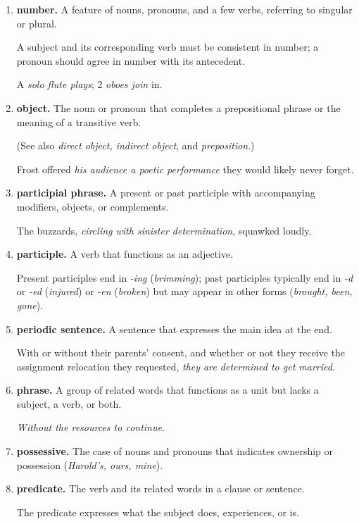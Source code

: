 \documentclass{book}
\numberwithin{equation}{section}
\begin{document}
\begin{enumerate}
    \textit{Carol}; the \textit{park}; the \textit{cup}; \textit{democracy}.
    \item \textbf{number.} A feature of nouns, pronouns, and a few verbs, referring to singular or plural.
    
    A subject and its corresponding verb must be consistent in number; a pronoun should agree in number with its antecedent.
    
    A \textit{solo flute plays}; 2 \textit{oboes join} in.
    \item \textbf{object.} The noun or pronoun that completes a prepositional phrase or the meaning of a transitive verb.
    
    (See also \textit{direct object, indirect object}, and \textit{preposition}.)
    
    Frost offered \textit{his audience a poetic performance} they would likely never forget.
    \item \textbf{participial phrase.} A present or past participle with accompanying modifiers, objects, or complements.
    
    The buzzards, \textit{circling with sinister determination}, squawked loudly.
    \item \textbf{participle.} A verb that functions as an adjective.
    
    Present participles end in \textit{-ing} (\textit{brimming}); past participles typically end in \textit{-d} or \textit{-ed} (\textit{injured}) or \textit{-en} (\textit{broken}) but may appear in other forms (\textit{brought, been, gone}).
    \item \textbf{periodic sentence.} A sentence that expresses the main idea at the end.
    
    With or without their parents' consent, and whether or not they receive the assignment relocation they requested, \textit{they are determined to get married}.
    \item \textbf{phrase.} A group of related words that functions as a unit but lacks a subject, a verb, or both.
    
    \textit{Without the resources to continue}.
    \item \textbf{possessive.} The case of nouns and pronouns that indicates ownership or possession (\textit{Harold's, ours, mine}).
    \item \textbf{predicate.} The verb and its related words in a clause or sentence.
    
    The predicate expresses what the subject does, experiences, or is.
    

\end{enumerate}
\end{document}
